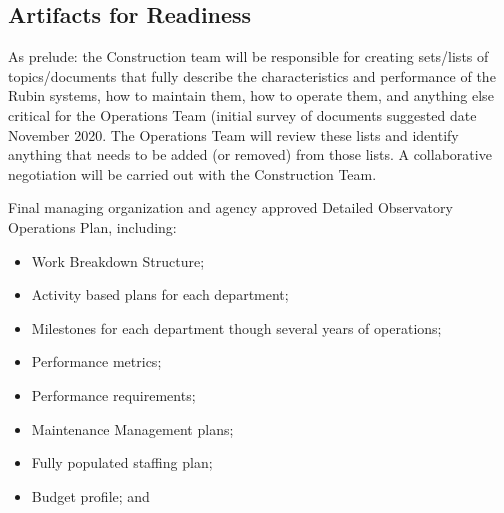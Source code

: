\subsection{Artifacts for Readiness}

 As prelude: the Construction team will be responsible for creating sets/lists of topics/documents that fully describe the characteristics and performance of the Rubin systems, how to maintain them, how to operate them, and anything else critical for the Operations Team (initial survey of documents suggested date November 2020. The Operations Team will review these lists and identify anything that needs to be added (or removed) from those lists. A collaborative negotiation will be carried out with the Construction Team.

Final managing organization and agency approved Detailed Observatory Operations Plan, including:

\begin{itemize}
	\item Work Breakdown Structure;
	\item Activity based plans for each department;
	\item Milestones for each department though several years of operations;
	\item Performance metrics;
	\item Performance requirements;
	\item Maintenance Management plans;
	\item Fully populated staffing plan;
	\item Budget profile; and

\end{itemize}
